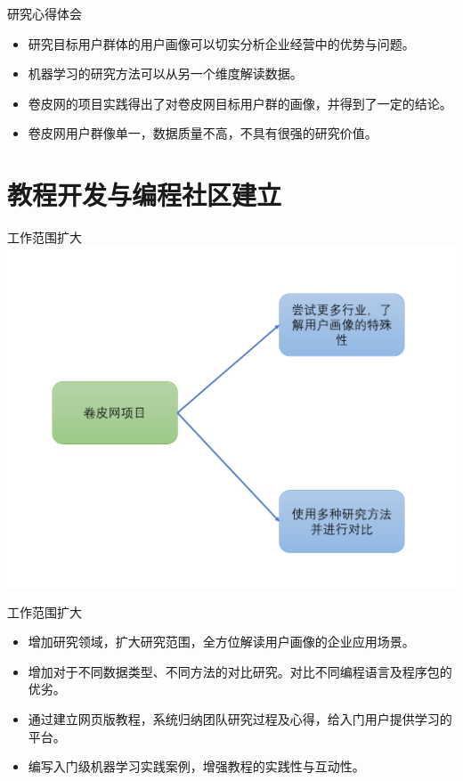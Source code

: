 \documentclass[10pt]{beamer}
\begin{document}
\begin{frame}{研究心得体会}
  \begin{itemize}
    \item 研究目标用户群体的用户画像可以切实分析企业经营中的优势与问题。\newline
    \item 机器学习的研究方法可以从另一个维度解读数据。\newline
    \item 卷皮网的项目实践得出了对卷皮网目标用户群的画像，并得到了一定的结论。\newline
    \item 卷皮网用户群像单一，数据质量不高，不具有很强的研究价值。\newline
  \end{itemize}
\end{frame}

\section{教程开发与编程社区建立}

\begin{frame}{工作范围扩大}
\includegraphics[height=0.7\paperheight]{amplify}
\end{frame}

\begin{frame}{工作范围扩大}
   \begin{itemize}
      \item 增加研究领域，扩大研究范围，全方位解读用户画像的企业应用场景。\newline
      \item 增加对于不同数据类型、不同方法的对比研究。对比不同编程语言及程序包的优劣。\newline
      \item 通过建立网页版教程，系统归纳团队研究过程及心得，给入门用户提供学习的平台。\newline
      \item 编写入门级机器学习实践案例，增强教程的实践性与互动性。
   \end{itemize}
\end{frame}
\end{document}
